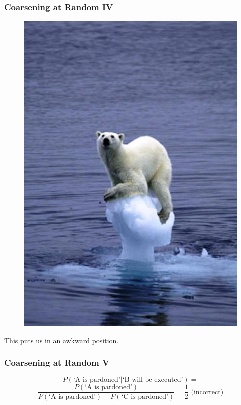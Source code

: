 \documentclass[xcolor=dvipsnames]{beamer}
\begin{document}
\begin{frame}
  \frametitle{Coarsening at Random IV}
  \begin{figure}[h]
    \includegraphics[scale=.25]{../diagrams/oh-no-global-warming.jpg}
  \end{figure}
\begin{center}
  This puts us in an awkward position.
\end{center}
\end{frame}

\begin{frame}
  \frametitle{Coarsening at Random V}
\begin{displaymath}
  P(\mbox{`A is pardoned'}|\mbox{`B will be
    executed'})=
\end{displaymath}
\begin{displaymath}
  \frac{P(\mbox{`A is pardoned'})}{P(\mbox{`A is
      pardoned'})+P(\mbox{`C is pardoned'})}=\frac{1}{2}\mbox{ (incorrect)}
\end{displaymath}
\end{frame}
\end{document}

